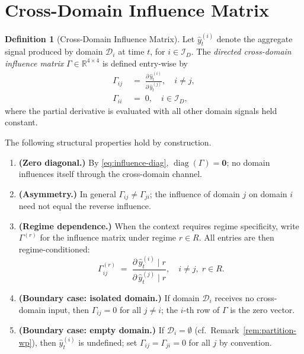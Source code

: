 \documentclass[12pt,openany]{book}
\newcommand{\R}{\mathbb{R}}
\numberwithin{equation}{chapter}
\theoremstyle{plain}
\theoremstyle{definition}
\newtheorem{definition}[theorem]{Definition}
\theoremstyle{remark}
\numberwithin{equation}{chapter}
\theoremstyle{plain}
\newcommand{\calR}{\mathcal{R}}
\def\calR{R}%
\begin{document}
\section{Cross-Domain Influence Matrix}
\label{sec:influence-matrix}

\begin{definition}[Cross-Domain Influence Matrix]
\label{def:influence-matrix}
Let $\hat{y}_t^{(i)}$ denote the aggregate signal produced by domain
$\mathcal{D}_i$ at time $t$, for $i \in \mathcal{I}_D$.
The \emph{directed cross-domain influence matrix}
$\Gamma \in \R^{4\times 4}$ is defined entry-wise by
\begin{align}
  \Gamma_{ij} &\;=\;
    \frac{\partial\,\hat{y}_t^{(i)}}{\partial\,\hat{y}_t^{(j)}},
  \quad i \neq j,
  \label{eq:influence-offdiag} \\
  \Gamma_{ii} &\;=\; 0,
  \quad i \in \mathcal{I}_D,
  \label{eq:influence-diag}
\end{align}
where the partial derivative is evaluated with all other domain signals
held constant.

\noindent The following structural properties hold by construction.

\begin{enumerate}
  \item \textbf{(Zero diagonal.)}
        By \eqref{eq:influence-diag}, $\operatorname{diag}(\Gamma) =
        \mathbf{0}$; no domain influences itself through the cross-domain
        channel.

  \item \textbf{(Asymmetry.)}
        In general $\Gamma_{ij} \neq \Gamma_{ji}$; the influence of
        domain $j$ on domain $i$ need not equal the reverse influence.

  \item \textbf{(Regime dependence.)}
        When the context requires regime specificity, write
        $\Gamma^{(r)}$ for the influence matrix under regime $r \in \calR$.
        All entries are then regime-conditioned:
        \begin{equation}
          \Gamma_{ij}^{(r)} \;=\;
          \frac{\partial\,\hat{y}_t^{(i)}\!\mid r}%
               {\partial\,\hat{y}_t^{(j)}\!\mid r},
          \quad i \neq j,\; r \in \calR.
          \label{eq:influence-regime}
        \end{equation}

  \item \textbf{(Boundary case: isolated domain.)}
        If domain $\mathcal{D}_i$ receives no cross-domain input, then
        $\Gamma_{ij} = 0$ for all $j \neq i$; the $i$-th row of $\Gamma$
        is the zero vector.

  \item \textbf{(Boundary case: empty domain.)}
        If $\mathcal{D}_i = \emptyset$ (cf.\ Remark~\ref{rem:partition-wp}),
        then $\hat{y}_t^{(i)}$ is undefined; set $\Gamma_{ij} = \Gamma_{ji}
        = 0$ for all $j$ by convention.
\end{enumerate}
\end{definition}
\end{document}
